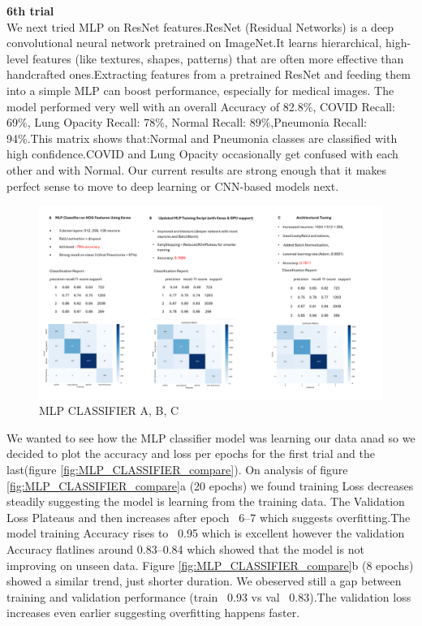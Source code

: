 \documentclass{article}
\begin{document}
\textbf{6th trial }\\
We next tried MLP on ResNet features.ResNet (Residual Networks) is a deep convolutional neural network pretrained on ImageNet.It learns hierarchical, high-level features (like textures, shapes, patterns) that are often more effective than handcrafted ones.Extracting features from a pretrained ResNet and feeding them into a simple MLP can boost performance, especially for medical images.
The model performed very well with an overall Accuracy of 82.8\%, COVID Recall: 69\%, Lung Opacity Recall: 78\%,    Normal Recall: 89\%,Pneumonia Recall: 94\%.This matrix shows that:Normal and Pneumonia classes are classified with high confidence.COVID and Lung Opacity occasionally get confused with each other and with Normal.
Our current results are strong enough that it makes perfect sense to move to deep learning or CNN-based models next.
\begin{figure}[ht] %
    \centering
    \includegraphics[width=1.0\linewidth]{mlpclassifier a,b,c.png}
    \caption{MLP CLASSIFIER A, B, C}
    \label{fig:MLP_CLASSIFIER}
\end{figure}
We wanted to see how the MLP classifier model was learning our data anad so we decided to plot the accuracy and loss per epochs for the first trial and the last(figure \ref{fig:MLP_CLASSIFIER_compare}). On analysis of figure \ref{fig:MLP_CLASSIFIER_compare}a (20 epochs) we found training Loss decreases steadily suggesting the model is learning from the training data.
The Validation Loss Plateaus and then increases after epoch ~6–7 which suggests overfitting.The model training Accuracy rises to ~0.95 which is excellent however the validation Accuracy flatlines around 0.83–0.84 which showed that the model is not improving on unseen data.
Figure \ref{fig:MLP_CLASSIFIER_compare}b (8 epochs) showed a similar trend, just shorter duration. We obeserved still a gap between training and validation performance (train ~0.93 vs val ~0.83).The validation loss increases even earlier suggesting overfitting happens faster.\\
\end{document}
